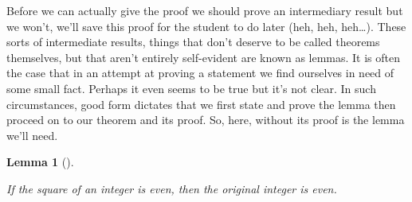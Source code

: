 \documentclass[10pt,]{book}
\theoremstyle{plain}
\newtheorem{lemma}[theorem]{Lemma}
\theoremstyle{definition}
\theoremstyle{definition}
\numberwithin{equation}{section}
\begin{document}
    Before we can actually give the proof we should prove an intermediary
    result \textemdash{} but we won't, we'll save this proof for the student to do
    later (heh, heh, heh\dots{}).
    These sorts of intermediate results, things that don't deserve to be
    called theorems themselves, but that aren't entirely self-evident are
    known as  lemmas. It is often the case that in an
    attempt at proving a statement we find ourselves in need of some small
    fact. Perhaps it even seems to be true but it's not clear. In such
    circumstances, good form dictates that we first state and prove the
    lemma then proceed on to our theorem and its proof. So, here, without
    its proof is the lemma we'll need.
\begin{lemma}[{}]\label{lemma-1}

        If the square of an integer is even, then the original
        integer is even.
\end{lemma}
\par
\end{document}
